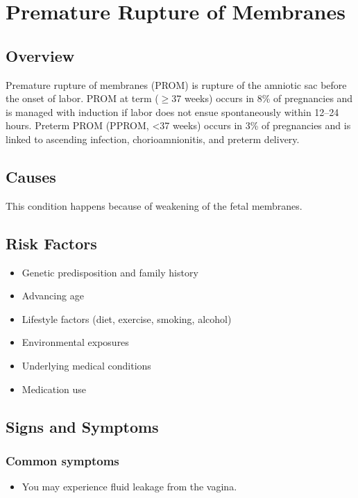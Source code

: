 \chapter{Premature Rupture of Membranes}
\label{sec:Premature Rupture of Membranes}

\section{Overview}
Premature rupture of membranes (PROM) is rupture of the amniotic sac before the onset of labor. PROM at term ($\ge$37 weeks) occurs in 8\% of pregnancies and is managed with induction if labor does not ensue spontaneously within 12--24 hours. Preterm PROM (PPROM, <37 weeks) occurs in 3\% of pregnancies and is linked to ascending infection, chorioamnionitis, and preterm delivery.
\section{Causes}
This condition happens because of weakening of the fetal membranes.     
\section{Risk Factors}

\begin{itemize}[noitemsep]
  \item Genetic predisposition and family history
  \item Advancing age
  \item Lifestyle factors (diet, exercise, smoking, alcohol)
  \item Environmental exposures
  \item Underlying medical conditions
  \item Medication use
\end{itemize}
\section{Signs and Symptoms}

\subsection{Common symptoms}
\begin{itemize}[noitemsep]
  \item You may experience fluid leakage from the vagina. 
  \end{itemize}


